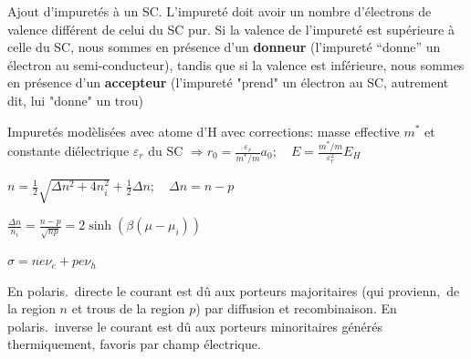 Ajout d’impuretés à un SC.
L’impureté doit avoir un nombre d’électrons de valence diﬀérent de celui du SC pur. Si la valence de l’impureté est supérieure à celle du SC, nous sommes en présence d’un \textbf{donneur} (l’impureté “donne” un électron au semi-conducteur), tandis que si la valence est inférieure, nous sommes en présence d’un \textbf{accepteur} (l’impureté "prend" un électron au SC, autrement dit, lui "donne" un trou)
\begin{squishlist}
    \item Impuretés modèlisées avec atome d'H avec corrections: masse effective $m^*$ et constante diélectrique $\varepsilon_r$ du SC 
    $\Longrightarrow r_0 = \frac{\varepsilon_r}{m^*/m} a_0; \quad E=\frac{m^*/m}{\varepsilon_r^2}E_H$
    \item $n = \frac{1}{2}\sqrt{\Delta n^2 + 4 n_i^2} + \frac{1}{2}\Delta n;\quad \Delta n = n - p$
    \item $\frac{\Delta n }{n_i} = \frac{n-p}{\sqrt{np}} = 2 \sinh (\beta(\mu - \mu_i))$
    \item $\sigma = n e \nu_e + p e \nu_h$
\end{squishlist}    

En polaris.\ directe le courant est dû aux porteurs majoritaires (\elec qui provienn,\ de la region $n$ et trous de la region $p$) par diffusion et recombinaison.
En polaris.\ inverse le courant est dû aux porteurs minoritaires générés thermiquement, favoris par champ électrique.